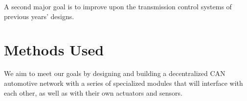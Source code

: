 A second major goal is to improve upon the transmission control systems
of previous years' designs.


\section{Methods Used}

We aim to meet our goals by designing and building a decentralized CAN
automotive network with a series of specialized modules that will interface
with each other, as well as with their own actuators and sensors.